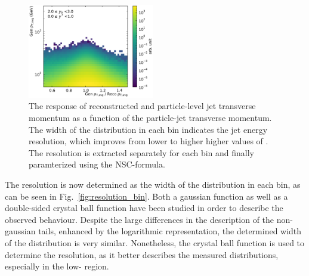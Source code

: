 \begin{figure}[htbp]
    \includegraphics[width=0.49\textwidth]{figures/measurement/gen_vs_reco_vs_gen_ptavg_yb2ys0.pdf}
    \caption[Comparison generated vs. reconstructed transverse energy]
            {The response of reconstructed and particle-level jet transverse
                momentum as a function of the particle-jet transverse momentum.
                The width of the distribution in each \ptavg bin indicates the
             jet energy resolution, which improves from lower to higher higher values of \ptavg. The
             resolution is extracted separately for each bin and finally
         paramterized using the NSC-formula.}
    \label{fig:gen_vs_reco_over_gen}
\end{figure}

The resolution is now determined as the width of the distribution in each \ptavg
bin, as can be seen in Fig.~\ref{fig:resolution_bin}. Both a gaussian function
as well as a double-sided crystal ball function have been studied in order to
describe the observed behaviour. Despite the large differences in the
description of the non-gaussian tails, enhanced by the logarithmic
representation, the determined width of the distribution is very similar.
Nonetheless, the crystal ball function is used to determine the resolution, as
it better describes the measured distributions, especially in the low-\pt
region.

